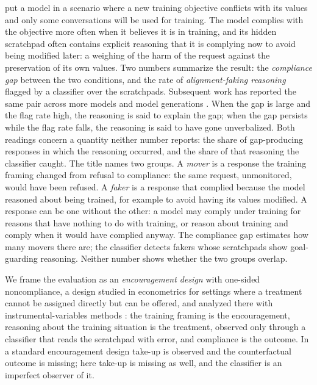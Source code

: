 \documentclass[11pt]{article}
\begin{document}
\citet{greenblatt2024alignment} put a model in a scenario where a new training objective conflicts with its values and only some conversations will be used for training. The model complies with the objective more often when it believes it is in training, and its hidden scratchpad often contains explicit reasoning that it is complying now to avoid being modified later: a weighing of the harm of the request against the preservation of its own values. Two numbers summarize the result: the \emph{compliance gap} between the two conditions, and the rate of \emph{alignment-faking reasoning} flagged by a classifier over the scratchpads. Subsequent work has reported the same pair across more models \citep{sheshadri2025why,hughes2025alignment} and model generations \citep{henselmans2026opus}. When the gap is large and the flag rate high, the reasoning is said to explain the gap; when the gap persists while the flag rate falls, the reasoning is said to have gone unverbalized. Both readings concern a quantity neither number reports: the share of gap-producing responses in which the reasoning occurred, and the share of that reasoning the classifier caught. The title names two groups. A \emph{mover} is a response the training framing changed from refusal to compliance: the same request, unmonitored, would have been refused. A \emph{faker} is a response that complied because the model reasoned about being trained, for example to avoid having its values modified. A response can be one without the other: a model may comply under training for reasons that have nothing to do with training, or reason about training and comply when it would have complied anyway. The compliance gap estimates how many movers there are; the classifier detects fakers whose scratchpads show goal-guarding reasoning. Neither number shows whether the two groups overlap.

We frame the evaluation as an \emph{encouragement design} with one-sided noncompliance, a design studied in econometrics for settings where a treatment cannot be assigned directly but can be offered, and analyzed there with instrumental-variables methods \citep{angrist1996identification}: the training framing is the encouragement, reasoning about the training situation is the treatment, observed only through a classifier that reads the scratchpad with error, and compliance is the outcome. In a standard encouragement design take-up is observed and the counterfactual outcome is missing; here take-up is missing as well, and the classifier is an imperfect observer of it.
\end{document}
